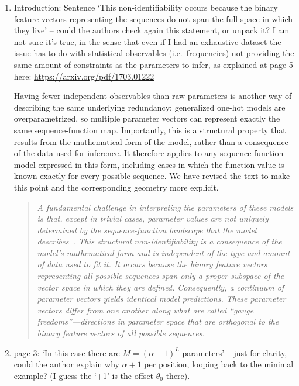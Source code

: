 \documentclass[11pt]{article}
\newenvironment{response}{\par\color{responseblue}}{\par}
\newenvironment{msquote}
  {\begin{quote}\color{responseblue}\itshape\noindent\ignorespaces}
  {\end{quote}}
\begin{document}
\begin{enumerate}

\item Introduction: Sentence `This non-identifiability occurs because the binary
feature vectors representing the sequences do not span the full space in which
they live' -- could the authors check again this statement, or unpack it? I am not
sure it's true, in the sense that even if I had an exhaustive dataset the issue
has to do with statistical observables (i.e.\ frequencies) not providing the same
amount of constraints as the parameters to infer, as explained at page 5 here:
\href{https://arxiv.org/pdf/1703.01222}{https://arxiv.org/pdf/1703.01222}

\begin{response}
Having fewer independent observables than raw parameters is another way of
describing the same underlying redundancy: generalized one-hot models are
overparametrized, so multiple parameter vectors can represent exactly the same
sequence-function map. Importantly, this is a structural property that results
from the mathematical form of the model, rather than a consequence of the data
used for inference. It therefore applies to any sequence-function model expressed
in this form, including cases in which the function value is known exactly for
every possible sequence. We have revised the text to make this point and the corresponding geometry more explicit.
\end{response}

\begin{msquote}
A fundamental challenge in interpreting the parameters of these models is that,
except in trivial cases, parameter values are not uniquely determined by the
sequence-function landscape that the model describes~\citep{Posfai2025bb}. This
structural non-identifiability is a consequence of the model's mathematical form
and is independent of the type and amount of data used to fit it. It occurs
because the binary feature vectors representing all possible sequences span only
a proper subspace of the vector space in which they are defined. Consequently, a
continuum of parameter vectors yields identical model predictions. These
parameter vectors differ from one another along what are called ``gauge
freedoms''---directions in parameter space that are orthogonal to the binary
feature vectors of all possible sequences.
\end{msquote}

\item page 3: `In this case there are $M = (\alpha + 1)^L$ parameters' -- just for
clarity, could the author explain why $\alpha+1$ per position, looping back to the
minimal example? (I guess the `+1' is the offset $\theta_0$ there).


\end{enumerate}
\end{document}
